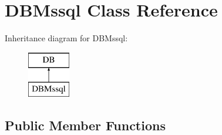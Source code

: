 \hypertarget{classDBMssql}{\section{D\+B\+Mssql Class Reference}
\label{classDBMssql}
}
Inheritance diagram for D\+B\+Mssql\+:\begin{figure}[H]
\begin{center}
\leavevmode
\includegraphics[height=2.000000cm]{classDBMssql}
\end{center}
\end{figure}
\subsection*{Public Member Functions}
